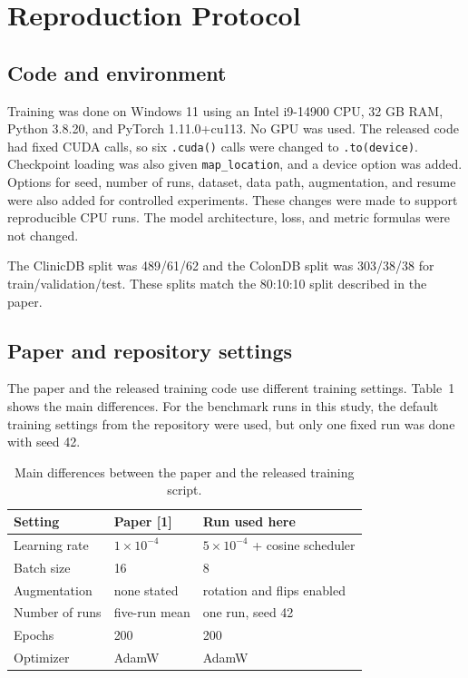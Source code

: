 \documentclass[10pt,a4paper]{article}
\begin{document}
\section{Reproduction Protocol}

\subsection{Code and environment}

Training was done on Windows 11 using an Intel i9-14900 CPU, 32 GB RAM, Python 3.8.20, and PyTorch 1.11.0+cu113. No GPU was used. The released code had fixed CUDA calls, so six \texttt{.cuda()} calls were changed to \texttt{.to(device)}. Checkpoint loading was also given \texttt{map\_location}, and a device option was added. Options for seed, number of runs, dataset, data path, augmentation, and resume were also added for controlled experiments. These changes were made to support reproducible CPU runs. The model architecture, loss, and metric formulas were not changed.

The ClinicDB split was 489/61/62 and the ColonDB split was 303/38/38 for train/validation/test. These splits match the 80:10:10 split described in the paper.

\subsection{Paper and repository settings}

The paper and the released training code use different training settings. Table~1 shows the main differences. For the benchmark runs in this study, the default training settings from the repository were used, but only one fixed run was done with seed 42.

\begin{table}[h]
\centering\small
\caption{Main differences between the paper and the released training script.}
\begin{tabular}{@{}lll@{}}
\toprule
Setting & Paper [1] & Run used here \\
\midrule
Learning rate & $1\times10^{-4}$ & $5\times10^{-4}$ + cosine scheduler \\
Batch size & 16 & 8 \\
Augmentation & none stated & rotation and flips enabled \\
Number of runs & five-run mean & one run, seed 42 \\
Epochs & 200 & 200 \\
Optimizer & AdamW & AdamW \\
\bottomrule
\end{tabular}
\end{table}
\end{document}
